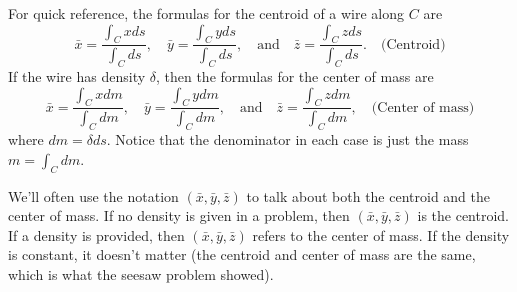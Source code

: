 For quick reference, the formulas for the centroid of a wire along $C$ are
$$
\bar x = \frac{\int_C x ds}{\int_C  ds},\quad
\bar y = \frac{\int_C y ds}{\int_C  ds},\quad 
\text{and}\quad
\bar z = \frac{\int_C z ds}{\int_C  ds}.  \quad\text{(Centroid)}
$$
If the wire has density $\delta$, then the formulas for the center of mass are 
%
$$
\bar x = \frac{\int_C x dm}{\int_C  dm},\quad
\bar y = \frac{\int_C y dm}{\int_C  dm},\quad 
\text{and}\quad
\bar z = \frac{\int_C z dm}{\int_C  dm},  \quad\text{(Center of mass)}
$$
where $dm=\delta ds$. Notice that the denominator in each case is just the mass $m=\int_C dm$.

We'll often use the notation $(\bar x, \bar y,\bar z)$ to talk about both the centroid and the center of mass. If no density is given in a problem, then $(\bar x, \bar y,\bar z)$ is the centroid. If a density is provided, then $(\bar x, \bar y,\bar z)$ refers to the center of mass. If the density is constant, it doesn't matter (the centroid and center of mass are the same, which is what the seesaw problem showed).

